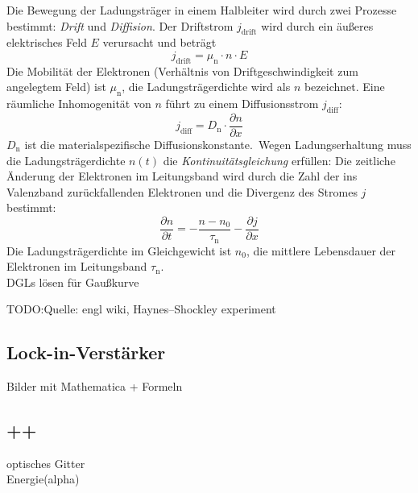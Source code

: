 Die Bewegung der Ladungsträger in einem Halbleiter wird durch zwei Prozesse bestimmt:
\emph{Drift} und \emph{Diffision}.
Der Driftstrom $j_{\text{drift}}$ wird durch ein äußeres elektrisches Feld $E$ verursacht
und beträgt
\begin{equation}
\label{}
j_{\text{drift}}=\mu_{\text{n}} \cdot n \cdot E
\end{equation}
Die Mobilität der Elektronen (Verhältnis von Driftgeschwindigkeit zum angelegtem Feld) ist $\mu_{\text{n}}$,
die Ladungsträgerdichte wird als $n$ bezeichnet.
Eine räumliche Inhomogenität von $n$ führt zu einem Diffusionsstrom $j_{\text{diff}}$:
\begin{equation}
\label{}
j_{\text{diff}}=D_{\text{n}} \cdot \frac{\partial n}{\partial x}
\end{equation}
$D_{\text{n}}$ ist die materialspezifische Diffusionskonstante.\
Wegen Ladungserhaltung muss die Ladungsträgerdichte $n(t)$ die \emph{Kontinuitätsgleichung} erfüllen:
Die zeitliche Änderung der Elektronen im Leitungsband wird durch die Zahl der ins Valenzband
zurückfallenden Elektronen und die Divergenz des Stromes $j$ bestimmt:
\begin{equation}
\label{}
\frac{\partial n}{\partial t}= -\frac{n-n_0}{\tau_{\text{n}}}-\frac{\partial j}{\partial x}
\end{equation}
Die Ladungsträgerdichte im Gleichgewicht ist $n_0$, die mittlere Lebensdauer der Elektronen
im Leitungsband $\tau_{\text{n}}$.\\


DGLs lösen für Gaußkurve



TODO:Quelle: engl wiki, Haynes–Shockley experiment



\subsection{Lock-in-Verstärker}


Bilder mit Mathematica + Formeln

\subsection{++}
optisches Gitter\\
Energie(alpha)
